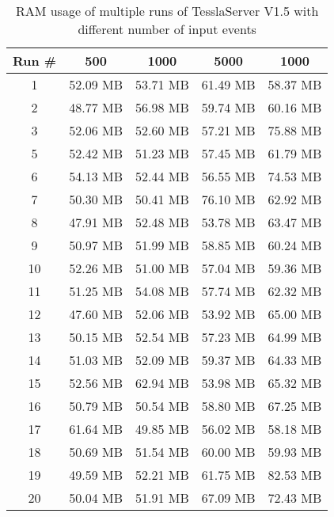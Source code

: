 \begin{table}[!htb]
  \centering
  \caption{RAM usage of multiple runs of TesslaServer V1.5 with different number of input events}
  \label{table:tessla_server_v1_5_events_ram_usage_data}
  \begin{tabular}{cllll}
    Run \# & \multicolumn{1}{c}{500} & \multicolumn{1}{c}{1000} & \multicolumn{1}{c}{5000} & \multicolumn{1}{c}{1000}\\ \hline
    1 & 52.09 MB & 53.71 MB & 61.49 MB & 58.37 MB \\
    2 & 48.77 MB & 56.98 MB & 59.74 MB & 60.16 MB \\
    3 & 52.06 MB & 52.60 MB & 57.21 MB & 75.88 MB \\
    5 & 52.42 MB & 51.23 MB & 57.45 MB & 61.79 MB \\
    6 & 54.13 MB & 52.44 MB & 56.55 MB & 74.53 MB \\
    7 & 50.30 MB & 50.41 MB & 76.10 MB & 62.92 MB \\
    8 & 47.91 MB & 52.48 MB & 53.78 MB & 63.47 MB \\
    9 & 50.97 MB & 51.99 MB & 58.85 MB & 60.24 MB \\
    10 &52.26 MB & 51.00 MB & 57.04 MB & 59.36 MB \\
    11 &51.25 MB & 54.08 MB & 57.74 MB & 62.32 MB \\
    12 &47.60 MB & 52.06 MB & 53.92 MB & 65.00 MB \\
    13 &50.15 MB & 52.54 MB & 57.23 MB & 64.99 MB \\
    14 &51.03 MB & 52.09 MB & 59.37 MB & 64.33 MB \\
    15 &52.56 MB & 62.94 MB & 53.98 MB & 65.32 MB \\
    16 &50.79 MB & 50.54 MB & 58.80 MB & 67.25 MB \\
    17 &61.64 MB & 49.85 MB & 56.02 MB & 58.18 MB \\
    18 &50.69 MB & 51.54 MB & 60.00 MB & 59.93 MB \\
    19 &49.59 MB & 52.21 MB & 61.75 MB & 82.53 MB \\
    20 &50.04 MB & 51.91 MB & 67.09 MB & 72.43 MB
  \end{tabular}
\end{table}

